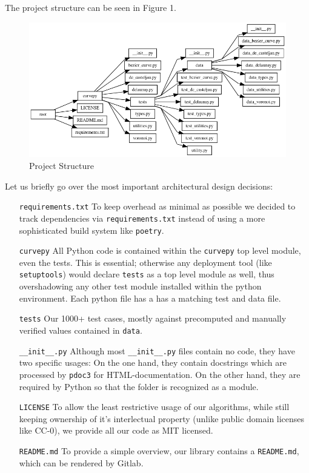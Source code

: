 The project structure can be seen in Figure 1.
\begin{figure}[H]
\centering
\includegraphics[width=\textwidth]{graphviz.png}
\caption{Project Structure}
\end{figure}
Let us briefly go over the most important architectural design decisions:
\begin{itemize}
    \item[\texttt{requirements.txt}] To keep overhead as minimal as possible we decided to track dependencies via \texttt{requirements.txt} instead of using a more sophisticated build system like \texttt{poetry}.
    \item[\texttt{curvepy}] All Python code is contained within the \texttt{curvepy} top level module, even the tests. This is essential; otherwise any deployment tool (like \texttt{setuptools}) would declare \texttt{tests} as a top level module as well, thus overshadowing any other test module installed within the python environment. Each python file has a has a matching test and data file.
    \item[\texttt{tests}] Our 1000+ test cases, mostly against precomputed and manually verified values contained in \texttt{data}.
    \item[\texttt{\_\_init\_\_.py}] Although most \texttt{\_\_init\_\_.py} files contain no code, they have two specific usages: On the one hand, they contain docstrings which are processed by \texttt{pdoc3} for HTML-documentation. On the other hand, they are required by Python so that the folder is recognized as a module.
    \item[\texttt{LICENSE}] To allow the least restrictive usage of our algorithms, while still keeping ownership of it's interlectual property (unlike public domain licenses like CC-0), we provide all our code as MIT licensed.
    \item[\texttt{README.md}] To provide a simple overview, our library contains a \texttt{README.md}, which can be rendered by Gitlab. 
\end{itemize}
